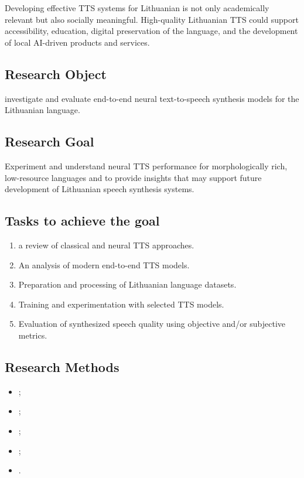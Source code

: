\documentclass[
         english, %
    monochrome, %
]{VUMIFSEMasterThesis}
\begin{document}
Developing effective TTS systems for Lithuanian is not only academically relevant but also socially meaningful. High-quality Lithuanian TTS could support accessibility, education, digital preservation of the language, and the development of local AI-driven products and services.

\subsection*{Research Object}

investigate and evaluate end-to-end neural text-to-speech synthesis models for the Lithuanian language.

\subsection*{Research Goal}

Experiment and understand neural TTS performance for morphologically rich, low-resource languages and to provide insights that may support future development of Lithuanian speech synthesis systems.

\subsection*{Tasks to achieve the goal}
\begin{enumerate}
\item a review of classical and neural TTS approaches.
\item An analysis of modern end-to-end TTS models.
\item Preparation and processing of Lithuanian language datasets.
\item Training and experimentation with selected TTS models.
\item Evaluation of synthesized speech quality using objective and/or subjective metrics.
\end{enumerate}

\subsection*{Research Methods}
\begin{itemize}
\item ;
\item ;
\item ;
\item ;
\item .
\end{itemize}
\end{document}
